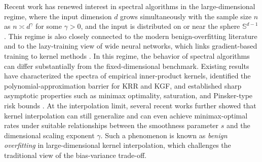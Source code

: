\documentclass{article}
\theoremstyle{plain}
\theoremstyle{definition}
\theoremstyle{remark}
\begin{document}
Recent work has renewed interest in spectral algorithms in the large-dimensional regime, where the input dimension $d$ grows simultaneously with the sample size $n$ as $n\asymp d^{\gamma}$ for some $\gamma>0$, and the input is distributed on or near the sphere $\mathbb{S}^{d-1}$. 
This regime is also closely connected to the modern benign-overfitting literature and to the lazy-training view of wide neural networks, which links gradient-based training to kernel methods \citep{bartlett2020benign,Jacot_NTK_2018,Arora_on_2019,Hu_Regularization_2021}. 
In this regime, the behavior of spectral algorithms can differ substantially from the fixed-dimensional benchmark. 
Existing results have characterized the spectra of empirical inner-product kernels, identified the polynomial-approximation barrier for KRR and KGF, and established sharp asymptotic properties such as minimax optimality, saturation, and Pinsker-type risk bounds \citep{Liang_Just_2019,ghorbani2021linearized,mei2022generalization,lu2023optimal,zhang2024optimal,lu2024saturation,lu2024pinsker}. 
At the interpolation limit, several recent works further showed that kernel interpolation can still generalize and can even achieve minimax-optimal rates under suitable relationships between the smoothness parameter $s$ and the dimensional scaling exponent $\gamma$. 
Such a phenomenon is known as \emph{benign overfitting} in large-dimensional kernel interpolation, which challenges the traditional view of the bias-variance trade-off. 
\end{document}
